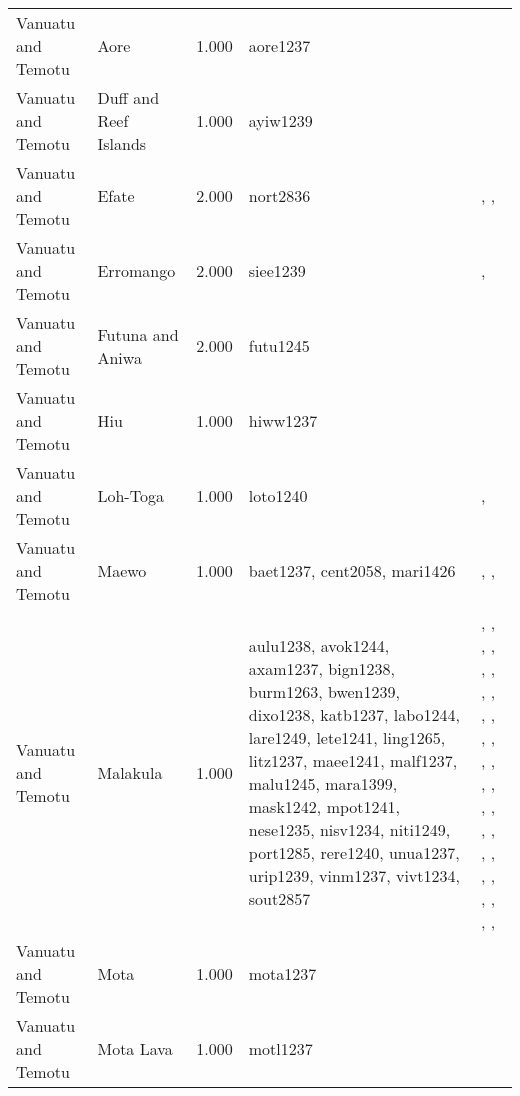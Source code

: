 \begin{longtable}{p{1.8cm}p{1.8cm}p{1.8cm}p{2cm}p{7cm}}
  Vanuatu and Temotu & Aore & 1.000 & aore1237 & \citet{bonnemaison1996power} \\ 
  Vanuatu and Temotu & Duff and Reef Islands & 1.000 & ayiw1239 & \citet{davenport1969} \\ 
  Vanuatu and Temotu & Efate & 2.000 & nort2836 & \citet{facey1981hereditary}, \citet{facey1981hereditary}, \citet{facey1981hereditary} \\ 
  Vanuatu and Temotu & Erromango & 2.000 & siee1239 & \citet{humphreys1926}, \citet{spriggs1989archaeological} \\ 
  Vanuatu and Temotu & Futuna and Aniwa & 2.000 & futu1245 & \citet{capell1958culture} \\ 
  Vanuatu and Temotu & Hiu & 1.000 & hiww1237 & \citet{bonnemaison1996power} \\ 
  Vanuatu and Temotu & Loh-Toga & 1.000 & loto1240 & \citet{bonnemaison1996power}, \citet{bonnemaison1996power} \\ 
  Vanuatu and Temotu & Maewo & 1.000 & baet1237, cent2058, mari1426 & \citet{bonnemaison1996power}, \citet{bonnemaison1996power}, \citet{bonnemaison1996power} \\ 
  Vanuatu and Temotu & Malakula & 1.000 & aulu1238, avok1244, axam1237, bign1238, burm1263, bwen1239, dixo1238, katb1237, labo1244, lare1249, lete1241, ling1265, litz1237, maee1241, malf1237, malu1245, mara1399, mask1242, mpot1241, nese1235, nisv1234, niti1249, port1285, rere1240, unua1237, urip1239, vinm1237, vivt1234, sout2857 & \citet{bonnemaison1996power}, \citet{bonnemaison1996power}, \citet{bonnemaison1996power}, \citet{bonnemaison1996power}, \citet{bonnemaison1996power}, \citet{bonnemaison1996power}, \citet{bonnemaison1996power}, \citet{bonnemaison1996power}, \citet{bonnemaison1996power}, \citet{bonnemaison1996power}, \citet{bonnemaison1996power}, \citet{bonnemaison1996power}, \citet{bonnemaison1996power}, \citet{bonnemaison1996power}, \citet{bonnemaison1996power}, \citet{bonnemaison1996power}, \citet{bonnemaison1996power}, \citet{bonnemaison1996power}, \citet{bonnemaison1996power}, \citet{bonnemaison1996power}, \citet{bonnemaison1996power}, \citet{bonnemaison1996power}, \citet{bonnemaison1996power}, \citet{bonnemaison1996power}, \citet{bonnemaison1996power}, \citet{bonnemaison1996power}, \citet{bonnemaison1996power}, \citet{bonnemaison1996power}, \citet{deacon1934} \\ 
  Vanuatu and Temotu & Mota & 1.000 & mota1237 & \citet{bonnemaison1996power} \\ 
  Vanuatu and Temotu & Mota Lava & 1.000 & motl1237 & \citet{bonnemaison1996power} \\ 

\end{longtable}
